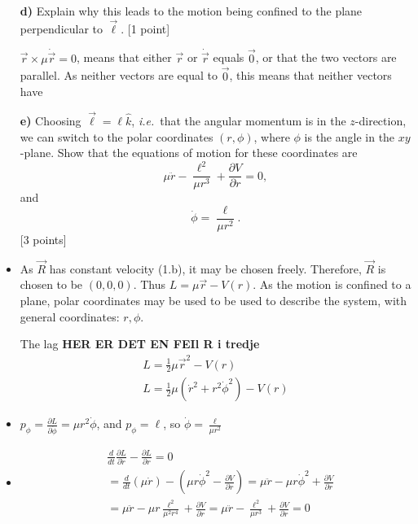\documentclass[11pt,a4paper]{report}
\newcounter{excount}[chapter]
\newenvironment{exercise}[1][]{\addtocounter{excount}{1} \noindent {\bf Question
    \arabic{excount} \ \ #1}\hspace{2mm}}{\vspace{4mm}}
\begin{document}
\begin{exercise}{\bf Central potentials\\}
\begin{itemize}
\item[{\bf d)}] Explain why this leads to the motion being confined to the plane perpendicular to $\vec\ell$. [1 point]

$\vec{r} \times \mu \dot{\vec{r}}=0$, means that either $\vec{r} $ or $\dot{\vec{r}}$ equals $\vec{0}$, or that the two vectors are parallel. As neither vectors are equal to $\vec{0}$, this means that neither vectors have


\item[{\bf e)}] Choosing $\vec\ell= \ell\hat k$, {\it i.e.}\ that the angular momentum is in the $z$-direction, we can switch to the polar coordinates $(r,\phi)$, where $\phi$ is the angle in the $xy$-plane. Show that the equations of motion for these coordinates are
\begin{equation}
\mu\ddot r-\frac{\ell^2}{\mu r^3}+\frac{\partial V}{\partial r}=0,\label{eq:LEQ_r}
\end{equation}
and
\begin{equation}
\dot\phi=\frac{\ell}{\mu r^2}\label{eq:LEQ_phi}.
\end{equation}
[3 points]


\item As $\vec{R}$ has constant velocity (1.b), it may be chosen freely. Therefore, $\vec{R}$ is chosen to be $(0,0,0)$. Thus $L=\mu \vec{r}-V(r)$. As the motion is confined to a plane, polar coordinates may be used to be used to describe the system, with general coordinates: $r, \phi$.  \par

The lag
\textbf{HER ER DET EN FEIl R i tredje}
\begin{align}
L=\frac{1}{2}\mu \vec{r}^2-V(r) \\
L=\frac{1}{2}\mu (\dot{r}^2+r^2\dot{\phi}^2)-V(r) \label{eq:1.e.L}
\end{align} 
\item $p_{\phi}=\frac{\partial L}{\partial \dot{\phi}}=\mu r^2 \dot{\phi}$, and $p_{\phi}=\ell$, so $\dot{\phi}=\frac{\ell}{\mu r^2}$
\item \begin{align}
&\frac{d}{dt}\frac{\partial L}{\partial \dot{r}}-\frac{\partial L}{\partial r}=0 \\
&=\frac{d}{dt}(\mu\dot{r})-(\mu r \dot{\phi}^2-\frac{\partial V}{\partial r})=\mu\ddot{r}-\mu r \dot{\phi}^2+\frac{\partial V}{\partial r}\\
&=\mu\ddot{r}-\mu r \frac{\ell^2}{\mu^2 r^4}+\frac{\partial V}{\partial r}=\mu\ddot{r}-\frac{\ell^2}{\mu r^3}+\frac{\partial V}{\partial r}=0
\end{align} 




\end{itemize}
\end{exercise}
\end{document}
